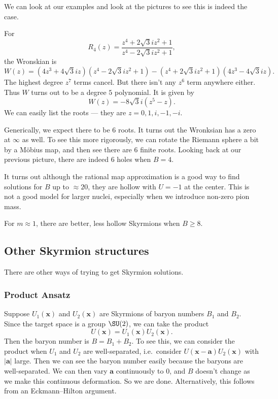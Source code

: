 \documentclass[a4paper]{article}
\begin{document}
We can look at our examples and look at the pictures to see this is indeed the case.

\begin{eg}
  For
  \[
    R_4(z) = \frac{z^4 + 2\sqrt{3} i z^2 + 1}{z^4 - 2\sqrt{3} i z^2 + 1},
  \]
  the Wronskian is
  \[
    W(z) = (4z^3 + 4 \sqrt{3}i z)(z^4 - 2\sqrt{3} i z^2 + 1) - (z^4 + 2 \sqrt{3} i z^2 + 1) (4z^3 - 4 \sqrt{3} i z).
  \]
  The highest degree $z^7$ terms cancel. But there isn't any $z^6$ term anywhere either. Thus $W$ turns out to be a degree $5$ polynomial. It is given by
  \[
    W(z) = - 8 \sqrt{3}i (z^5 - z).
  \]
  We can easily list the roots --- they are $z = 0, 1, i, -1, -i$.

  Generically, we expect there to be $6$ roots. It turns out the Wronksian has a zero at $\infty$ as well. To see this more rigorously, we can rotate the Riemann sphere a bit by a M\"obius map, and then see there are $6$ finite roots. Looking back at our previous picture, there are indeed $6$ holes when $B = 4$.
\end{eg}



It turns out although the rational map approximation is a good way to find solutions for $B$ up to $\approx 20$, they are hollow with $U = -1$ at the center. This is not a good model for larger nuclei, especially when we introduce non-zero pion mass.

For $m \approx 1$, there are better, less hollow Skyrmions when $B \geq 8$.

\subsection{Other Skyrmion structures}
There are other ways of trying to get Skyrmion solutions.

\subsubsection*{Product Ansatz}
Suppose $U_1(\mathbf{x})$ and $U_2(\mathbf{x})$ are Skyrmions of baryon numbers $B_1$ and $B_2$. Since the target space is a group $\SU(2)$, we can take the product
\[
  U(\mathbf{x}) = U_1(\mathbf{x}) U_2(\mathbf{x}).
\]
Then the baryon number is $B = B_1 + B_2$. To see this, we can consider the product when $U_1$ and $U_2$ are well-separated, i.e.\ consider $U(\mathbf{x} - \mathbf{a}) U_2(\mathbf{x})$ with $|\mathbf{a}|$ large. Then we can see the baryon number easily because the baryons are well-separated. We can then vary $\mathbf{a}$ continuously to $0$, and $B$ doesn't change as we make this continuous deformation. So we are done. Alternatively, this follows from an Eckmann--Hilton argument.
\end{document}
